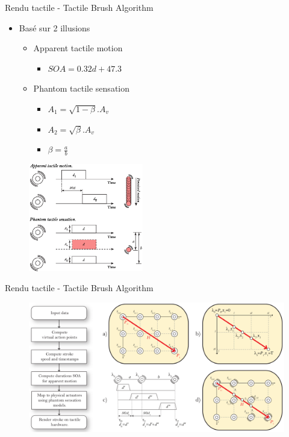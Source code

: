 {
\begin{frame}{Rendu tactile - Tactile Brush Algorithm}
\begin{multicols}{2}
\begin{itemize}
\item Basé sur 2 illusions
\begin{itemize}
\item Apparent tactile motion
\begin{itemize}
\item $SOA = 0.32d + 47.3$
\end{itemize}
\item Phantom tactile sensation
\begin{itemize}
\item $A_1 = \sqrt{1-\beta}.A_v$
\item $A_2 = \sqrt{\beta}.A_v$
\item $\beta = \frac{a}{b}$ 
\end{itemize}
\end{itemize}
\end{itemize}

\begin{figure}
\centering
\includegraphics[width=5cm]{images/tactile-illusions}
\end{figure}
\end{multicols}
\end{frame}

\begin{frame}{Rendu tactile - Tactile Brush Algorithm}
\begin{figure}
\centering
\includegraphics[width=\linewidth]{images/tactile_brush}
\end{figure}
\end{frame}
}

